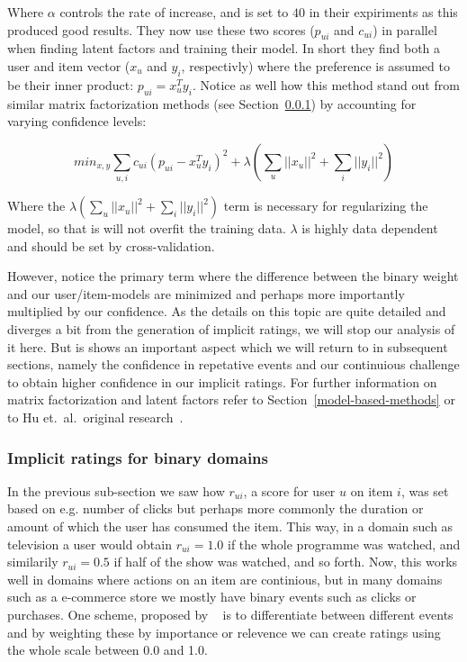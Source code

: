 Where $\alpha$ controls the rate of increase, and is set to $40$ in their
expiriments as this produced good results. They now use these two scores
($p_{ui}$ and $c_{ui}$) in parallel when finding latent factors and training
their model. In short they find both a user and item vector ($x_u$ and $y_i$,
respectivly) where the preference is assumed to be their inner product: $p_{ui}
= x_{u}^{T} y_{i}$. Notice as well how this method stand out from similar
matrix factorization methods (see Section~\ref{}) by accounting for varying
confidence levels:

\begin{equation}
  min_{x,y} \sum _{u,i} c_{ui} (p_{ui} - x_{u}^{T} y_i)^2 + \lambda (\sum _{u}
  || x_u ||^2 + \sum_{i} || y_i ||^2)
\end{equation}

Where the $\lambda (\sum _{u} || x_u ||^2 + \sum_{i} || y_i ||^2)$ term is
necessary for regularizing the model, so that is will not overfit the
training data. $\lambda$ is highly data dependent and should be set by
cross-validation.

However, notice the primary term where the difference between the binary weight
and our user/item-models are minimized and perhaps more importantly multiplied
by our confidence. As the details on this topic are quite detailed and diverges
a bit from the generation of implicit ratings, we will stop our analysis of it
here. But is shows an important aspect which we will return to in subsequent
sections, namely the confidence in repetative events and our continuious
challenge to obtain higher confidence in our implicit ratings. For further
information on matrix factorization and latent factors refer to
Section~\ref{model-based-methods} or to Hu et.\ al.\ original
research~\cite{Hu2008}.

\subsubsection{Implicit ratings for binary domains}

In the previous sub-section we saw how $r_{ui}$, a score for user $u$ on item
$i$, was set based on e.g. number of clicks but perhaps more commonly the
duration or amount of which the user has consumed the item. This way, in a
domain such as television a user would obtain $r_{ui} = 1.0$ if the whole
programme was watched, and similarily $r_{ui} = 0.5$ if half of the show was
watched, and so forth. Now, this works well in domains where actions on an item
are continious, but in many domains such as a e-commerce store we mostly have
binary events such as clicks or purchases. One scheme, proposed by
~\cite{pkghost2014implicit} is to differentiate between different events and by
weighting these by importance or relevence we can create ratings using the
whole scale between 0.0 and 1.0.

